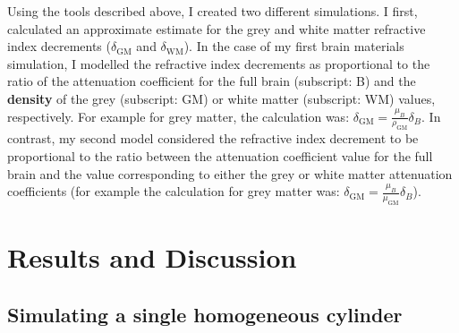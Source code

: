 \documentclass[10pt, a4paper, singlespacing]{report}
\begin{document}
Using the tools described above, I created two different simulations. I first, calculated an approximate estimate for the grey and white matter refractive index decrements ($\delta_{\mathrm{GM}}$ and $\delta_{\mathrm{WM}}$). In the case of my first brain materials simulation, I modelled the refractive index decrements as proportional to the ratio of the attenuation coefficient for the full brain (subscript: B) and the \textbf{density} of the grey (subscript: GM) or white matter (subscript: WM) values, respectively. For example for grey matter, the calculation was: $\delta_{\mathrm{GM}} = \frac{\mu_B}{\rho_{\mathrm{GM}}} \delta_B$. In contrast, my second model considered the refractive index decrement to be proportional to the ratio between the attenuation coefficient value for the full brain and the value corresponding to either the grey or white matter attenuation coefficients (for example the calculation for grey matter was: $\delta_{\mathrm{GM}} = \frac{\mu_B}{\mu_{\mathrm{GM}}} \delta_B$). 


\section{Results and Discussion}\label{Results}

\subsection{Simulating a single homogeneous cylinder}\label{cylinder}
\end{document}
